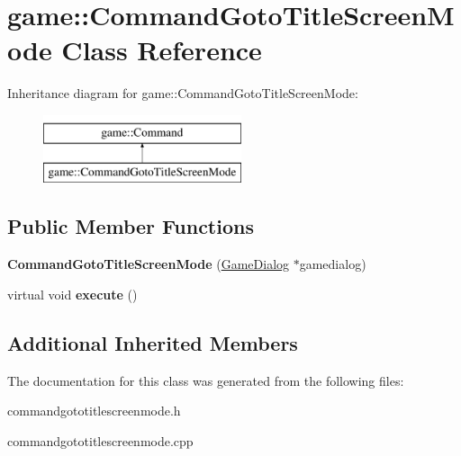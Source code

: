 \hypertarget{classgame_1_1CommandGotoTitleScreenMode}{}\section{game\+:\+:Command\+Goto\+Title\+Screen\+Mode Class Reference}
\label{classgame_1_1CommandGotoTitleScreenMode}
Inheritance diagram for game\+:\+:Command\+Goto\+Title\+Screen\+Mode\+:\begin{figure}[H]
\begin{center}
\leavevmode
\includegraphics[height=2.000000cm]{classgame_1_1CommandGotoTitleScreenMode}
\end{center}
\end{figure}
\subsection*{Public Member Functions}
\begin{DoxyCompactItemize}
\item 
\mbox{\label{classgame_1_1CommandGotoTitleScreenMode_a4eb22eb11ea1b38493a56cf632c0f48e}} 
{\bfseries Command\+Goto\+Title\+Screen\+Mode} (\hyperlink{classgame_1_1GameDialog}{Game\+Dialog} $\ast$gamedialog)
\item 
\mbox{\label{classgame_1_1CommandGotoTitleScreenMode_afa16f2f39d1009c82b5a5a8012380f15}} 
virtual void {\bfseries execute} ()
\end{DoxyCompactItemize}
\subsection*{Additional Inherited Members}


The documentation for this class was generated from the following files\+:\begin{DoxyCompactItemize}
\item 
commandgototitlescreenmode.\+h\item 
commandgototitlescreenmode.\+cpp\end{DoxyCompactItemize}
